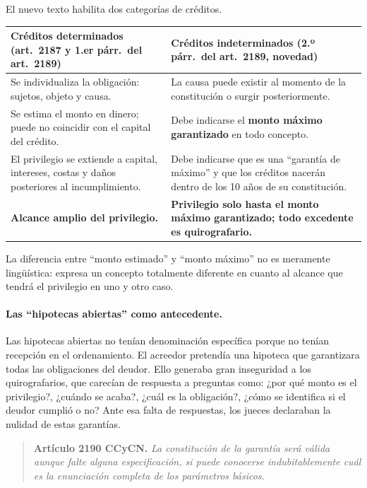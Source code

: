 \documentclass[12pt,oneside]{book}
\begin{document}
El nuevo texto habilita dos categorías de créditos.

\begin{table}[H]
\centering
\begin{tabularx}{\textwidth}{@{}LL@{}}
\toprule
\textbf{Créditos determinados (art.~2187 y 1.er párr.\ del art.~2189)} & \textbf{Créditos indeterminados (2.º párr.\ del art.~2189, novedad)} \\
\midrule
Se individualiza la obligación: sujetos, objeto y causa. & La causa puede existir al momento de la constitución o surgir posteriormente. \\
\addlinespace
Se estima el monto en dinero; puede no coincidir con el capital del crédito. & Debe indicarse el \textbf{monto máximo garantizado} en todo concepto. \\
\addlinespace
El privilegio se extiende a capital, intereses, costas y daños posteriores al incumplimiento. & Debe indicarse que es una ``garantía de máximo'' y que los créditos nacerán dentro de los 10 años de su constitución. \\
\addlinespace
\textbf{Alcance amplio del privilegio.} & \textbf{Privilegio solo hasta el monto máximo garantizado; todo excedente es quirografario.} \\
\bottomrule
\end{tabularx}
\end{table}

\begin{importante}
La diferencia entre ``monto estimado'' y ``monto máximo'' no es meramente lingüística: expresa un concepto totalmente diferente en cuanto al alcance que tendrá el privilegio en uno y otro caso.
\end{importante}

\paragraph{Las ``hipotecas abiertas'' como antecedente.} Las hipotecas abiertas no tenían denominación específica porque no tenían recepción en el ordenamiento. El acreedor pretendía una hipoteca que garantizara todas las obligaciones del deudor. Ello generaba gran inseguridad a los quirografarios, que carecían de respuesta a preguntas como: ¿por qué monto es el privilegio?, ¿cuándo se acaba?, ¿cuál es la obligación?, ¿cómo se identifica si el deudor cumplió o no? Ante esa falta de respuestas, los jueces declaraban la nulidad de estas garantías.

\begin{quote}
\textbf{Artículo 2190 CCyCN.} \textit{La constitución de la garantía será válida aunque falte alguna especificación, si puede conocerse indubitablemente cuál es la enunciación completa de los parámetros básicos.}
\end{quote}
\end{document}
